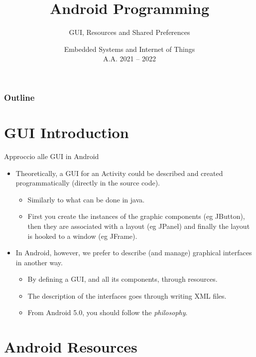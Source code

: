 \documentclass{beamer}
\title[Android -- 2B -- GUI]{Android Programming}
\subtitle{GUI, Resources and Shared Preferences}
\date[ver. 1.0 (20220505)]{Embedded Systems and Internet of Things\\A.A. 2021 -- 2022}
\begin{document}
  \begin{frame}
    \titlepage
  \end{frame}

  

  \begin{frame}
    \frametitle{Outline}
    \tableofcontents
  \end{frame}

\section{GUI Introduction}

  \begin{frame}{Approccio alle GUI in Android}
    \begin{itemize}\itemsep20pt
      \item Theoretically, a GUI for an Activity could be described and created
      programmatically (directly in the source code).
      \begin{itemize}
        \item Similarly to what can be done in java.
        \item First you create the instances of the graphic components (eg JButton),
        then they are associated with a layout (eg JPanel) and finally the layout is
        hooked to a window (eg JFrame).
      \end{itemize}
      \item In Android, however, we prefer to describe (and manage) graphical
      interfaces in another way. 
      \begin{itemize}
        \item By defining a GUI, and all its components, through resources.
        \item The description of the interfaces goes through writing XML files.
        \item From Android 5.0, you should follow the 
        \textit{philosophy}.
      \end{itemize}
    \end{itemize}
  \end{frame}

\section{Android Resources}
\end{document}
